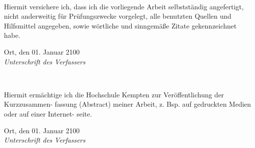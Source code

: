 \newpage
\thispagestyle{empty}


\\ 

\vspace*{2cm}

\noindent
Hiermit versichere ich, dass ich die vorliegende Arbeit selbstständig angefertigt, 
nicht anderweitig für Prüfungszwecke vorgelegt, alle benutzten
Quellen und Hilfsmittel angegeben, sowie wörtliche und sinngemäße Zitate gekennzeichnet habe.
\vspace{2cm}

\noindent
Ort, den 01. Januar 2100
\hspace*{2cm}%
\dotfill\\
\hspace*{8.5cm}%
\textit{Unterschrift des Verfassers}

\vspace*{5cm}

\\ 

\vspace*{2cm}

\noindent
Hiermit ermächtige ich die Hochschule Kempten zur Veröffentlichung der Kurzzusammen-
fassung (Abstract) meiner Arbeit, z. Bsp. auf gedruckten Medien oder auf einer Internet-
seite.
\vspace{2cm}

\noindent
Ort, den 01. Januar 2100
\hspace*{2cm}%
\dotfill\\
\hspace*{8.5cm}%
\textit{Unterschrift des Verfassers}
